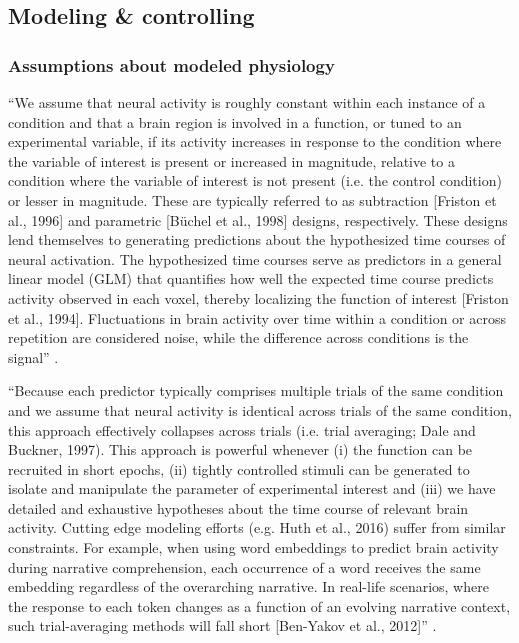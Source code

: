 \subsection{Modeling \& controlling}

\subsubsection{Assumptions about modeled physiology}

%
``We assume that neural activity is roughly constant within each instance of a
condition and that a brain region is involved in a function, or tuned to an
experimental variable, if its activity increases in response to the condition
where the variable of interest is present or increased in magnitude, relative to
a condition where the variable of interest is not present (i.e. the control
condition) or lesser in magnitude.
%
These are typically referred to as subtraction [Friston et al., 1996] and
parametric [Büchel et al., 1998] designs, respectively.
%
These designs lend themselves to generating predictions about the hypothesized
time courses of neural activation.
%
The hypothesized time courses serve as predictors in a general linear model
(GLM) that quantifies how well the expected time course predicts activity
observed in each voxel, thereby localizing the function of interest [Friston et
al., 1994].
%
Fluctuations in brain activity over time within a condition or across repetition
are considered noise, while the difference across conditions is the signal''
\citep{nastase2019measuring}.

%
``Because each predictor typically comprises multiple trials of the same
condition and we assume that neural activity is identical across trials of the
same condition, this approach effectively collapses across trials (i.e. trial
averaging; Dale and Buckner, 1997).
%
This approach is powerful whenever
%
(i) the function can be recruited in short epochs,
%
(ii) tightly controlled stimuli can be generated to isolate and manipulate the
parameter of experimental interest and
%
(iii) we have detailed and exhaustive hypotheses about the time course of
relevant brain activity.
%
Cutting edge modeling efforts (e.g. Huth et al., 2016) suffer from similar
constraints.
%
For example, when using word embeddings to predict brain activity during
narrative comprehension, each occurrence of a word receives the same embedding
regardless of the overarching narrative.
%
In real-life scenarios, where the response to each token changes as a function
of an evolving narrative context, such trial-averaging methods will fall short
[Ben-Yakov et al., 2012]'' \citep{nastase2019measuring}.

